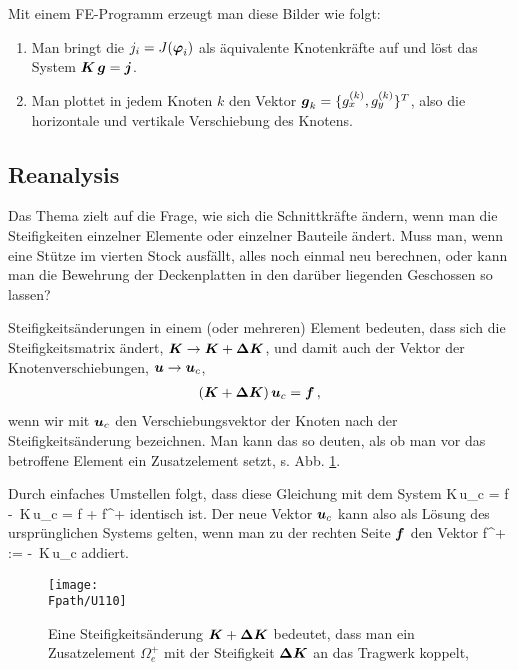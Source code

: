 {{\begin{remark}
Mit einem FE-Programm erzeugt man diese Bilder wie folgt:
\begin{enumerate}
  \item Man bringt die $j_i = J(\mbox{\boldmath $\varphi$}_i)$ als \"{a}quivalente Knotenkr\"{a}fte auf und l\"{o}st das System $\mbox{\boldmath $K$}\,\mbox{\boldmath $g$} = \mbox{\boldmath $j$}$.
  \item Man plottet in jedem Knoten $k$ den Vektor $\mbox{\boldmath $g$}_k = \{g_x^{(k)}, g_y^{(k)}\}^T$, also die horizontale und vertikale Verschiebung des Knotens.
\end{enumerate}
\end{remark}
\vspace{-0.7cm}
{\textcolor{sectionTitleBlue}{\section{Reanalysis}}}
Das Thema zielt auf die Frage, wie sich die Schnittkr\"{a}fte \"{a}ndern, wenn man die Steifigkeiten einzelner Elemente oder einzelner Bauteile \"{a}ndert. Muss man, wenn eine St\"{u}tze im vierten Stock ausf\"{a}llt, alles noch einmal neu berechnen, oder kann man die Bewehrung der Deckenplatten in den dar\"{u}ber liegenden Geschossen so lassen?

Steifigkeits\"{a}nderungen in einem (oder mehreren) Element bedeuten, dass sich die Steifigkeitsmatrix \"{a}ndert, $\mbox{\boldmath $K$} \to \mbox{\boldmath $K$} + \mbox{\boldmath $\Delta$} \mbox{\boldmath $K$}$, und damit auch der Vektor der Knotenverschiebungen, $\mbox{\boldmath $u$} \to \mbox{\boldmath $u$}_c$,
\begin{align}
(\mbox{\boldmath $K$} + \mbox{\boldmath $\Delta$} \mbox{\boldmath $K$})\,\mbox{\boldmath $u$}_c = \mbox{\boldmath $f$}\,,
\end{align}
wenn wir mit $\mbox{\boldmath $u$}_c$ den Verschiebungsvektor der Knoten nach der Steifigkeits\"{a}nderung bezeichnen. Man kann das so deuten, als ob man vor das betroffene Element ein Zusatzelement setzt, s. Abb. \ref{U110}.

Durch einfaches Umstellen folgt, dass diese Gleichung mit dem System
\beq
\vek K\,\vek u_c = \vek f - \vek \Delta\,\vek K\,\vek u_c = \vek f + \vek f^+
\eeq
identisch ist. Der neue Vektor $\mbox{\boldmath $u$}_c$ kann also als L\"{o}sung des urspr\"{u}nglichen Systems gelten, wenn man zu der rechten Seite $\mbox{\boldmath $f$}$ den Vektor
\beq
\vek f^+ := - \vek \Delta\,\vek K\,\vek u_c
\eeq
addiert.
\begin{figure}
\centering
\if {} \sidecaption \fi
{\texttt{[image: \\Fpath/U110]}} \caption{Eine Steifigkeits\"{a}nderung $\mbox{\boldmath $K$} + \mbox{\boldmath $\Delta$} \mbox{\boldmath $K$} $ bedeutet, dass man ein Zusatzelement $\Omega_e^+$ mit der
 Steifigkeit $\mbox{\boldmath $\Delta$} \mbox{\boldmath $K$} $ an das Tragwerk koppelt, \cite{Ha6}}
\label{U110}%
\end{figure}%

}}
